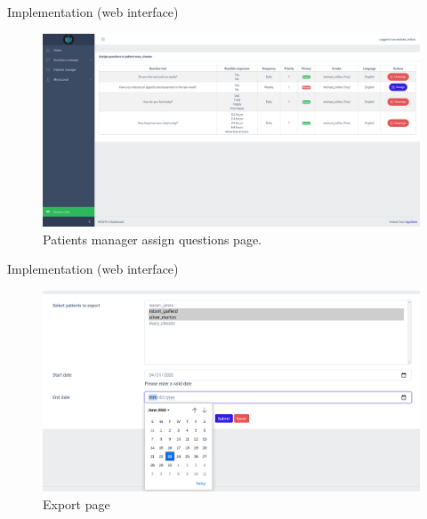 \documentclass{beamer}
\begin{document}
\begin{frame}[fragile]{Implementation (web interface)}
  \begin{figure}[H]
    \centering
      \includegraphics[width=\textwidth]{assign_questions.png}
    \caption{Patients manager assign questions page.}
  \end{figure}
\end{frame}
\begin{frame}[fragile]{Implementation (web interface)}
  \begin{figure}[H]
    \centering
      \includegraphics[width=\textwidth]{export.png}
    \caption{Export page}
  \end{figure}
\end{frame}
\end{document}
